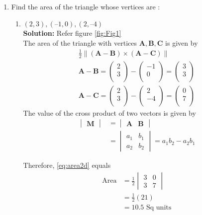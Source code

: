 \documentclass[12pt]{article}
\newcommand{\mydet}[1]{\ensuremath{\begin{vmatrix}#1\end{vmatrix}}}
\providecommand{\brak}[1]{\ensuremath{\left(#1\right)}}
\providecommand{\norm}[1]{\left\lVert#1\right\rVert}
\newcommand{\solution}{\noindent \textbf{Solution: }}
\newcommand{\myvec}[1]{\ensuremath{\begin{pmatrix}#1\end{pmatrix}}}
\let\vec\mathbf
\begin{document}
\begin{enumerate}
\item Find the area of the triangle whose vertices are :
\begin{enumerate}
\item $(2, 3), (–1, 0), (2, – 4)$  \\
\solution Refer figure \ref{fig:Fig1} \\
The area of the triangle with vertices $\vec{A}, \vec{B}, \vec{C}$ is given by  
  \label{prop:area2d}
  \begin{align}
    \label{eq:area2d}
	\frac{1}{2}\norm{\brak{\vec{A}-\vec{B}} \times \brak{\vec{A}-\vec{C}}} \\
	 \vec{A}-\vec{B} =  \myvec{
  2 \\
  3 \\
 } - \myvec{
  -1 \\
  0 \\
 } = \myvec{
 3 \\
 3 \\
 }
 \\
 \vec{A}-\vec{C} =  \myvec{
  2 \\
  3 \\
 } - \myvec{
  2 \\
  -4 \\
 } = \myvec{
 0 \\
 7 \\
 }
 \end{align}
The value of the cross product of two vectors is given by
\begin{align}
  \label{eq:det2d}
  \mydet{\vec{M}} &= \mydet{\vec{A} & \vec{B}} 
  \\
  &= \mydet{a_1 & b_1\\a_2 & b_2} = a_1b_2 - a_2 b_1
\end{align}

		Therefore, \eqref{eq:area2d} equals \\
\begin{align}
	\text{Area} &=	\frac{1}{2}\mydet{3 & 0\\3 & 7}  \\
	&=	\frac{1}{2}\brak{21}  \\
	&=10.5 \text{ Sq units}	       
\end{align}


\end{enumerate}
\end{enumerate}
\end{document}
